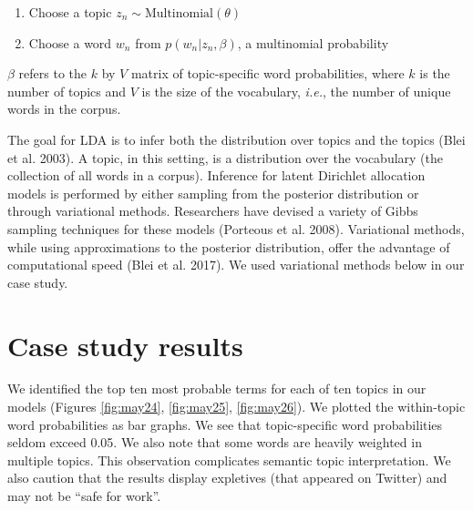 \documentclass[
]{article}
\providecommand{\tightlist}{%
  \setlength{\itemsep}{0pt}\setlength{\parskip}{0pt}}
\begin{document}
\begin{enumerate}
\def\labelenumi{\alph{enumi}.}
\tightlist
\item
  Choose a topic \(z_n \sim \text{Multinomial}(\theta)\)\\
\item
  Choose a word \(w_n\) from \(p(w_n | z_n, \beta)\), a multinomial probability
\end{enumerate}

\(\beta\) refers to the \(k\) by \(V\) matrix of topic-specific word probabilities, where \(k\)
is the number of topics and \(V\) is the size of the vocabulary, \emph{i.e.}, the number of unique words in the corpus.

The goal for LDA is to infer both the distribution over topics and
the topics (Blei et al. 2003). A topic, in this setting, is a distribution over
the vocabulary (the collection of all words in a corpus).
Inference for latent Dirichlet allocation models is performed by either
sampling from the posterior distribution or through variational methods. Researchers
have devised a variety of Gibbs sampling techniques for these models (Porteous et al. 2008).
Variational methods, while using approximations to the posterior distribution, offer the
advantage of computational speed (Blei et al. 2017). We used variational methods below in our case study.

\hypertarget{case-study-results}{%
\section{Case study results}\label{case-study-results}}

We identified the top ten most probable terms for each of ten topics in our models
(Figures \ref{fig:may24}, \ref{fig:may25}, \ref{fig:may26}).
We plotted the within-topic word probabilities as bar graphs. We see that topic-specific
word probabilities seldom exceed 0.05. We also note that some words are heavily weighted in
multiple topics. This observation complicates semantic topic interpretation. We
also caution that the results display expletives (that appeared on Twitter) and may
not be ``safe for work''.
\end{document}
